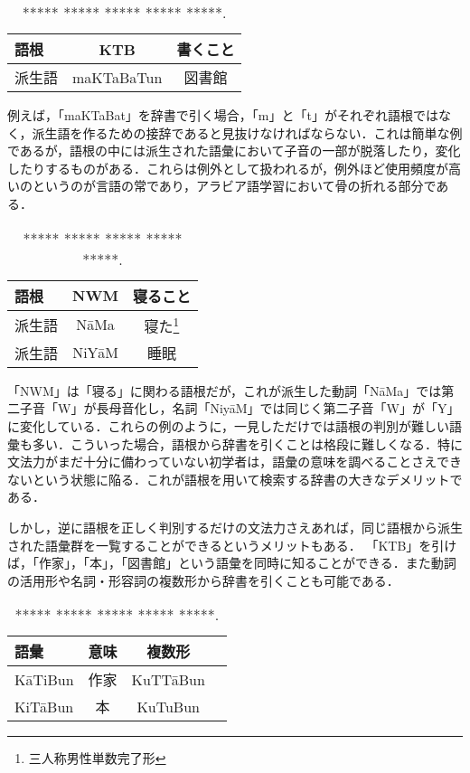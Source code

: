 \documentclass[technicalreport]{ieicej}
\begin{document}
\begin{table}[ht]
\begin{center}
\begin{tabular}{l|cc}
   語根& KTB & 書くこと\\
  \hline
 派生語& maKTaBaTun & 図書館\\
\hline
\end{tabular}
\caption{***** ***** ***** ***** *****.}
\label{table:alignment}
\end{center}
\end{table}

例えば，「maKTaBat」を辞書で引く場合，「m」と「t」がそれぞれ語根ではなく，派生語を作るための接辞であると見抜けなければならない．これは簡単な例であるが，語根の中には派生された語彙において子音の一部が脱落したり，変化したりするものがある．これらは例外として扱われるが，例外ほど使用頻度が高いのというのが言語の常であり，アラビア語学習において骨の折れる部分である．

\begin{table}[ht]
\begin{center}
\begin{tabular}{l|cc}
   語根& NWM & 寝ること\\
  \hline
 派生語& NāMa & 寝た\footnote{三人称男性単数完了形}\\
  派生語& NiYāM & 睡眠\\
\hline
\end{tabular}
\caption{***** ***** ***** ***** *****.}
\label{table:alignment}
\end{center}
\end{table}

「NWM」は「寝る」に関わる語根だが，これが派生した動詞「NāMa」では第二子音「W」が長母音化し，名詞「NiyāM」では同じく第二子音「W」が「Y」に変化している．これらの例のように，一見しただけでは語根の判別が難しい語彙も多い．こういった場合，語根から辞書を引くことは格段に難しくなる．特に文法力がまだ十分に備わっていない初学者は，語彙の意味を調べることさえできないという状態に陥る．これが語根を用いて検索する辞書の大きなデメリットである．

しかし，逆に語根を正しく判別するだけの文法力さえあれば，同じ語根から派生された語彙群を一覧することができるというメリットもある． 「KTB」を引けば，「作家」，「本」，「図書館」という語彙を同時に知ることができる．また動詞の活用形や名詞・形容詞の複数形から辞書を引くことも可能である．

\begin{table}[ht]
\begin{center}
\begin{tabular}{l|ccc}
   語彙 & 意味 & 複数形\\
  \hline
 KāTiBun & 作家 & KuTTāBun \\
  KiTāBun & 本 & KuTuBun\\
\hline
\end{tabular}
\caption{***** ***** ***** ***** *****.}
\label{table:alignment}
\end{center}
\end{table}
\end{document}
